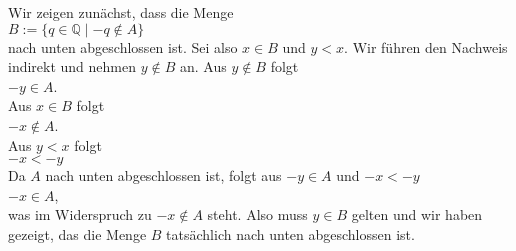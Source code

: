 \proof
Wir zeigen zun\"achst, dass die Menge
\\[0.2cm]
\hspace*{1.3cm}
 $B := \{ q \in \mathbb{Q} \mid -q \not\in A \}$ 
\\[0.2cm]
nach unten abgeschlossen ist.  Sei also $x \in B$ und $y < x$.  Wir f\"uhren den Nachweis indirekt und
nehmen $y \not\in B$ an.  Aus $y \not\in B$ folgt
\\[0.2cm]
\hspace*{1.3cm}
$-y \in A$.
\\[0.2cm]
Aus $x \in B$ folgt
\\[0.2cm]
\hspace*{1.3cm}
$-x \not\in A$.
\\[0.2cm]
Aus $y < x$ folgt 
\\[0.2cm]
\hspace*{1.3cm}
$-x < -y$
\\[0.2cm]
Da $A$ nach unten abgeschlossen ist, folgt aus $-y \in A$ und $-x < -y$ 
\\[0.2cm]
\hspace*{1.3cm}
$-x \in A$, 
\\[0.2cm]
was im Widerspruch zu $-x \not\in A$ steht.  Also muss $y \in B$ gelten und wir haben gezeigt, das die Menge $B$
tats\"achlich nach unten abgeschlossen ist.
